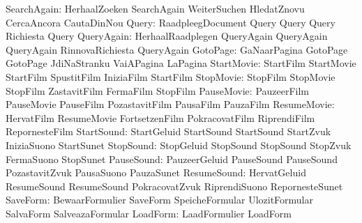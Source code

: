               SearchAgain: HerhaalZoeken             SearchAgain
                           WeiterSuchen              HledatZnovu
                           CercaAncora               CautaDinNou
                    Query: RaadpleegDocument         Query
                           Query                     Query
                           Richiesta                 Query %
               QueryAgain: HerhaalRaadplegen         QueryAgain
                           QueryAgain                QueryAgain
                           RinnovaRichiesta          QueryAgain %
                 GotoPage: GaNaarPagina              GotoPage
                           GotoPage                  JdiNaStranku
                           VaiAPagina                LaPagina %
               StartMovie: StartFilm                 StartMovie
                           StartFilm                 SpustitFilm
                           IniziaFilm                StartFilm
                StopMovie: StopFilm                  StopMovie
                           StopFilm                  ZastavitFilm
                           FermaFilm                 StopFilm
               PauseMovie: PauzeerFilm               PauseMovie
                           PauseFilm                 PozastavitFilm
                           PausaFilm                 PauzaFilm
              ResumeMovie: HervatFilm                ResumeMovie
                           FortsetzenFilm            PokracovatFilm
                           RiprendiFilm              RepornesteFilm
               StartSound: StartGeluid               StartSound
                           StartSound                StartZvuk
                           IniziaSuono               StartSunet %
                StopSound: StopGeluid                StopSound
                           StopSound                 StopZvuk
                           FermaSuono                StopSunet %
               PauseSound: PauzeerGeluid             PauseSound
                           PauseSound                PozastavitZvuk
                           PausaSuono                PauzaSunet %
              ResumeSound: HervatGeluid              ResumeSound
                           ResumeSound               PokracovatZvuk
                           RiprendiSuono             RepornesteSunet %
                 SaveForm: BewaarFormulier           SaveForm
                           SpeicheFormular           UlozitFormular
                           SalvaForm                 SalveazaFormular
                 LoadForm: LaadFormulier             LoadForm
